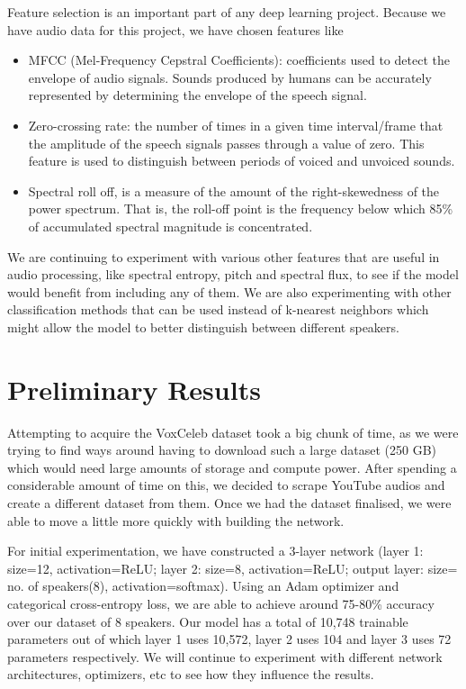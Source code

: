\documentclass[10pt,twocolumn,letterpaper]{article}
\begin{document}
Feature selection is an important part of any deep learning project. Because we have audio data for this project, we have chosen features like 
\begin{itemize}
    \item MFCC (Mel-Frequency Cepstral Coefficients): coefficients used to detect the envelope of audio signals. Sounds produced by humans can be accurately represented by determining the envelope of the speech signal.
    \item Zero-crossing rate: the number of times in a given time interval/frame that the amplitude of the speech signals passes through a value of zero. This feature is used to distinguish between periods of voiced and unvoiced sounds.
    \item Spectral roll off, is a measure of the amount of the right-skewedness of the power spectrum. That is, the roll-off point is the frequency below which 85\% of accumulated spectral magnitude is concentrated.
\end{itemize}

We are continuing to experiment with various other features that are useful in audio processing, like spectral entropy, pitch and spectral flux, to see if the model would benefit from including any of them. We are also experimenting with other classification methods that can be used instead of k-nearest neighbors which might allow the model to better distinguish between different speakers.


\section{Preliminary Results}

Attempting to acquire the VoxCeleb dataset took a big chunk of time, as we were trying to find ways around having to download such a large dataset (250 GB) which would need large amounts of storage and compute power. After spending a considerable amount of time on this, we decided to scrape YouTube audios and create a different dataset from them. Once we had the dataset finalised, we were able to move a little more quickly with building the network.

For initial experimentation, we have constructed a 3-layer network (layer 1: size=12, activation=ReLU; layer 2: size=8, activation=ReLU; output layer: size= no. of speakers(8), activation=softmax). Using an Adam optimizer and categorical cross-entropy loss, we are able to achieve around 75-80\% accuracy over our dataset of 8 speakers. Our model has a total of 10,748 trainable parameters out of which layer 1 uses 10,572, layer 2 uses 104 and layer 3 uses 72 parameters respectively. We will continue to experiment with different network architectures, optimizers, etc to see how they influence the results.
\end{document}
